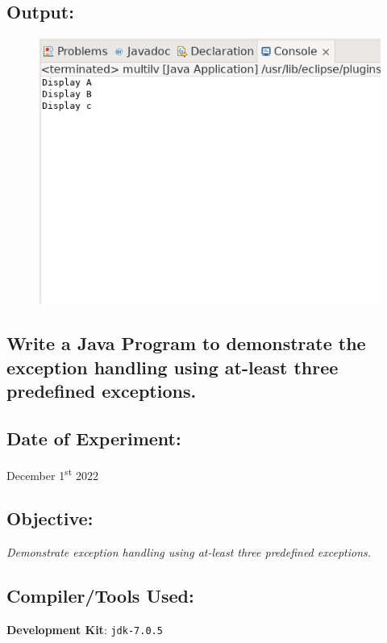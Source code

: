 \documentclass[12pt, a4paper]{article}
\begin{document}
\subsection*{Output:}
\begin{figure}[h]
  \centering
  \includegraphics[width=\textwidth]{multilv}
\end{figure}
\newpage

\begin{tcolorbox}
\section{Write a Java Program to demonstrate the exception handling using at-least three predefined exceptions.}
\end{tcolorbox}

\subsection*{Date of Experiment:}
December 1\textsuperscript{st} 2022

\subsection*{Objective:}
\emph{\large{Demonstrate exception handling using at-least three predefined exceptions.}}

\subsection*{Compiler/Tools Used:}
\textbf{Development Kit}: \verb+jdk-7.0.5+
\end{document}
